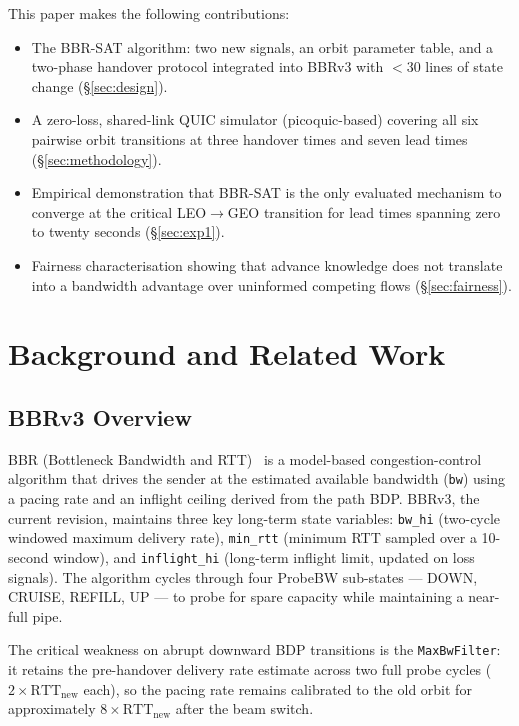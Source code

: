 \documentclass[conference]{IEEEtran}
\begin{document}
This paper makes the following contributions:
\begin{itemize}
  \item The BBR-SAT algorithm: two new signals, an orbit parameter table,
        and a two-phase handover protocol integrated into BBRv3 with
        $<$30 lines of state change (\S\ref{sec:design}).
  \item A zero-loss, shared-link QUIC simulator (picoquic-based) covering
        all six pairwise orbit transitions at three handover times and
        seven lead times (\S\ref{sec:methodology}).
  \item Empirical demonstration that BBR-SAT is the only evaluated mechanism
        to converge at the critical LEO$\to$GEO transition for lead times
        spanning zero to twenty seconds (\S\ref{sec:exp1}).
  \item Fairness characterisation showing that advance knowledge does not
        translate into a bandwidth advantage over uninformed competing flows
        (\S\ref{sec:fairness}).
\end{itemize}

\section{Background and Related Work}
\label{sec:related}

\subsection{BBRv3 Overview}

BBR (Bottleneck Bandwidth and RTT)~\cite{cardwell2017} is a model-based
congestion-control algorithm that drives the sender at the estimated
available bandwidth (\texttt{bw}) using a pacing rate and an inflight
ceiling derived from the path BDP.
BBRv3, the current revision, maintains three key long-term state variables:
\texttt{bw\_hi} (two-cycle windowed maximum delivery rate),
\texttt{min\_rtt} (minimum RTT sampled over a 10-second window), and
\texttt{inflight\_hi} (long-term inflight limit, updated on loss signals).
The algorithm cycles through four ProbeBW sub-states ---
DOWN, CRUISE, REFILL, UP --- to probe for spare capacity while maintaining
a near-full pipe.

The critical weakness on abrupt downward BDP transitions is the
\texttt{MaxBwFilter}: it retains the pre-handover delivery rate estimate
across two full probe cycles ($2 \times \mathrm{RTT}_\mathrm{new}$ each),
so the pacing rate remains calibrated to the old orbit for approximately
$8 \times \mathrm{RTT}_\mathrm{new}$ after the beam switch.
\end{document}
